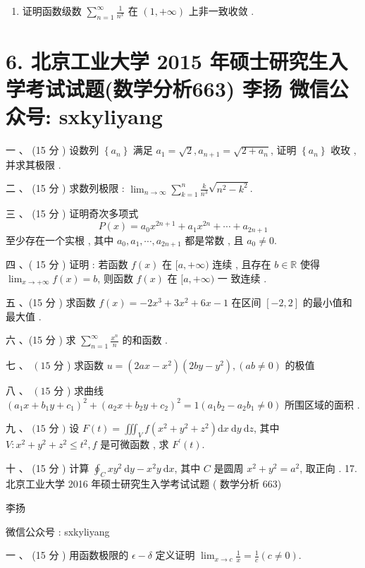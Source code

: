 \documentclass[10pt]{article}
\begin{document}
{\begin{enumerate}
  \item  证明函数级数  $\sum_{n=1}^{\infty} \frac{1}{n^{x}}$  在  $(1,+\infty)$  上非一致收敛 .

\end{enumerate}
\section{6. 北京工业大学 2015 年硕士研究生入学考试试题(数学分析663) 
 李扬 
 微信公众号: sxkyliyang}
 一 、 (15  分 )  设数列  $\left\{a_{n}\right\}$  满足  $a_{1}=\sqrt{2}, a_{n+1}=\sqrt{2+a_{n}}$,  证明  $\left\{a_{n}\right\}$  收玫 ,  并求其极限 .

 二 、 (15  分 )  求数列极限 : $\lim _{n \rightarrow \infty} \sum_{k=1}^{n} \frac{k}{n^{3}} \sqrt{n^{2}-k^{2}}$.

 三 、 (15  分 )  证明奇次多项式 
$$
P(x)=a_{0} x^{2 n+1}+a_{1} x^{2 n}+\cdots+a_{2 n+1}
$$
 至少存在一个实根 ,  其中  $a_{0}, a_{1}, \cdots, a_{2 n+1}$  都是常数 ,  且  $a_{0} \neq 0$.

 四 、( 15  分 )  证明 :  若函数  $f(x)$  在  $[a,+\infty)$  连续 ,  且存在  $b \in \mathbb{R}$  使得  $\lim _{x \rightarrow+\infty} f(x)=b$,  则函数  $f(x)$  在  $[a,+\infty)$  一   致连续 .

 五 、(15  分 )  求函数  $f(x)=-2 x^{3}+3 x^{2}+6 x-1$  在区间  $[-2,2]$  的最小值和最大值 .

 六 、(15  分 )  求  $\sum_{n=1}^{\infty} \frac{x^{n}}{n}$  的和函数 .

 七 、 $\left(15\right.$  分 )  求函数  $u=\left(2 a x-x^{2}\right)\left(2 b y-y^{2}\right),(a b \neq 0)$  的极值 

 八 、 $\left(15\right.$  分 )  求曲线  $\left(a_{1} x+b_{1} y+c_{1}\right)^{2}+\left(a_{2} x+b_{2} y+c_{2}\right)^{2}=1\left(a_{1} b_{2}-a_{2} b_{1} \neq 0\right)$  所围区域的面积 .

 九 、 $(15$  分  $)$  设  $F(t)=\iiint_{V} f\left(x^{2}+y^{2}+z^{2}\right) \mathrm{d} x \mathrm{~d} y \mathrm{~d} z$,  其中  $V: x^{2}+y^{2}+z^{2} \leq t^{2}, f$  是可微函数 ,  求  $F^{\prime}(t)$.

 十 、 (15  分 )  计算  $\oint_{C} x y^{2} \mathrm{~d} y-x^{2} y \mathrm{~d} x$,  其中  $C$  是圆周  $x^{2}+y^{2}=a^{2}$,  取正向 . 17.  北京工业大学  2016  年硕士研究生入学考试试题 ( 数学分析 663)

 李扬 

 微信公众号 : sxkyliyang

 一 、 (15  分 )  用函数极限的  $\epsilon-\delta$  定义证明  $\lim _{x \rightarrow c} \frac{1}{x}=\frac{1}{c}(c \neq 0)$.

}
\end{document}
